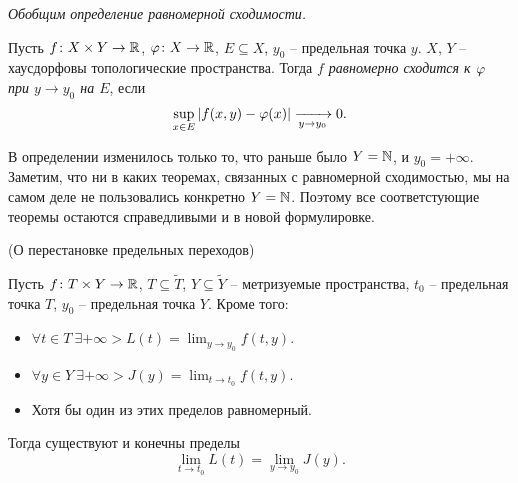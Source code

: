 \textit{Обобщим определение равномерной сходимости.}

\begin{definition}
    Пусть $f \colon X \times Y \to \R$, $\f \colon X \to \R$, $E \subseteq X$, $y_0$ -- предельная
    точка $y$. $X$, $Y$ -- хаусдорфовы топологические пространства. Тогда \textit{$f$ равномерно сходится к $\f$ 
    при $y \to y_0$ на $E$}, если
    \[
        \sup_{x \in E}{\abs*{f(x, y) - \f(x)}} \xrightarrow[y \to y_0]{} 0
    .\]
\end{definition}

\begin{remark}
    В определении изменилось только то, что раньше было $Y = \bN$, и $y_0 = +\infty$.
    Заметим, что ни в каких теоремах, связанных с равномерной сходимостью, 
    мы на самом деле не пользовались конкретно $Y = \bN$. Поэтому все соответстующие
    теоремы остаются справедливыми и в новой формулировке.
\end{remark}

\begin{theorem}(О перестановке предельных переходов)

    Пусть $f \colon T \times Y \to \R$, $T \subseteq \widetilde{T}$, $Y \subseteq \widetilde{Y}$ --
    метризуемые пространства, $t_0$ -- предельная точка $T$, $y_0$ -- предельная точка $Y$. Кроме того:
    \begin{itemize}
        \item $\displaystyle \forall t \in T~ \exists +\infty > L(t) = \lim_{y \to y_0}{f(t, y)}$.
        \item $\displaystyle \forall y \in Y~ \exists +\infty > J(y) = \lim_{t \to t_0}{f(t, y)}$.
        \item Хотя бы один из этих пределов равномерный.
    \end{itemize}
    Тогда существуют и конечны пределы
    \[
        \lim_{t \to t_0}{L(t)} = \lim_{y \to y_0}{J(y)}
    .\]
\end{theorem}

